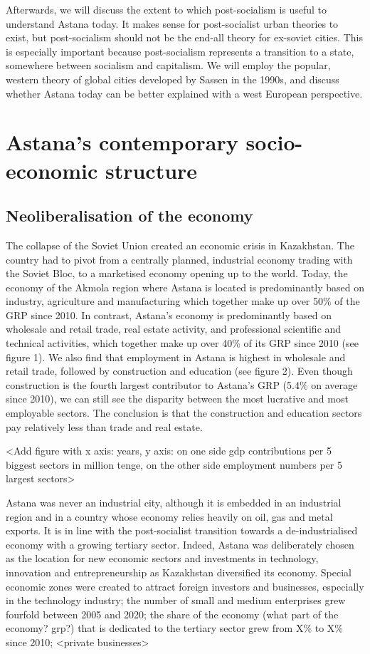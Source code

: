 \documentclass{article}
\begin{document}
Afterwards, we will discuss the extent to which post-socialism is useful to understand Astana today. It makes sense for post-socialist urban theories to exist, but post-socialism should not be the end-all theory for ex-soviet cities. This is especially important because post-socialism represents a transition to a state, somewhere between socialism and capitalism. 
We will employ the popular, western theory of global cities developed by Sassen in the 1990s, and discuss whether Astana today can be better explained with a west European perspective.

\section{Astana's contemporary socio-economic structure}

\subsection{Neoliberalisation of the economy}

The collapse of the Soviet Union created an economic crisis in Kazakhstan. The country had to pivot from a centrally planned, industrial economy trading with the Soviet Bloc, to a marketised economy opening up to the world. Today, the economy of the Akmola region where Astana is located is predominantly based on industry, agriculture and manufacturing which together make up over 50\% of the GRP since 2010. In contrast, Astana's economy is predominantly based on wholesale and retail trade, real estate activity, and professional scientific and technical activities, which together make up over 40\% of its GRP since 2010 (see figure 1).  We also find that employment in Astana is highest in wholesale and retail trade, followed by construction and education (see figure 2). Even though construction is the fourth largest contributor to Astana's GRP (5.4\% on average since 2010), we can still see the disparity between the most lucrative and most employable sectors. The conclusion is that the construction and education sectors pay relatively less than trade and real estate.

<Add figure with x axis: years, y axis: on one side gdp contributions per 5 biggest sectors in million tenge, on the other side employment numbers per 5 largest sectors>

Astana was never an industrial city, although it is embedded in an industrial region and in a country whose economy relies heavily on oil, gas and metal exports. It is in line with the post-socialist transition towards a de-industrialised economy with a growing tertiary sector.
Indeed, Astana was deliberately chosen as the location for new economic sectors and investments in technology, innovation and entrepreneurship as Kazakhstan diversified its economy. Special economic zones were created to attract foreign investors and businesses, especially in the technology industry; the number of small and medium enterprises grew fourfold between 2005 and 2020; the share of the economy (what part of the economy? grp?) that is dedicated to the tertiary sector grew from X\% to X\% since 2010; <private businesses>
\end{document}
